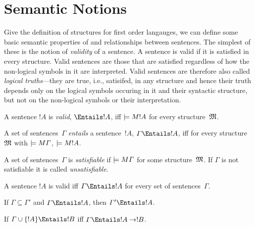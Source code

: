 \documentclass[syntax-and-semantics]{subfiles}
\begin{document}
\section{Semantic Notions}

\begin{wordy}
Give the definition of structures for first order langauges, we can
define some basic semantic properties of and relationships between
sentences.  The simplest of these is the notion of \emph{validity} of
a sentence.  A sentence is valid if it is satisfied in every
structure.  Valid sentences are those that are satisfied regardless of
how the non-logical symbols in it are interpreted.  Valid sentences
are therefore also called \emph{logical truths}---they are true, i.e.,
satisifed, in any structure and hence their truth depends only on the
logical symbols occuring in it and their syntactic structure, but not
on the non-logical symbols or their interpretation.  
\end{wordy}

\begin{defn}[Validity]
A sentence $!A$ is \emph{valid}, $\Entails !A$, iff $\models{M}{!A}$ for every
structure~$\mathfrak M$.
\end{defn}

\begin{defn}[Entailment]
A set of sentences~$\Gamma$ \emph{entails} a sentence~$!A$, $\Gamma
\Entails !A$, iff for every structure~$\mathfrak M$ with
$\models{M}{\Gamma}$, $\models{M}{!A}$.
\end{defn}

\begin{defn}[Satisfiability]
A set of sentences~$\Gamma$ is \emph{satisfiable} if $\models{M}{\Gamma}$
for some structure~$\mathfrak M$.  If $\Gamma$ is not satisfiable it is
called \emph{unsatisfiable}.
\end{defn}

\begin{prop}
A sentence $!A$ is valid iff $\Gamma \Entails !A$ for every set of
sentences~$\Gamma$.
\end{prop}


\begin{prop}
$\Gamma \Entails !A$ iff $\Gamma \cup \{\lnot !A}$ is unsatisfiable.
\end{prop}


\begin{prop}
If $\Gamma \subseteq \Gamma'$ and $\Gamma \Entails !A$, then $\Gamma'
\Entails !A$.
\end{prop}


\begin{thm}
If $\Gamma \cup \{!A\} \Entails !B$ iff $\Gamma \Entails !A \lif !B$.
\end{thm}

\end{document}
